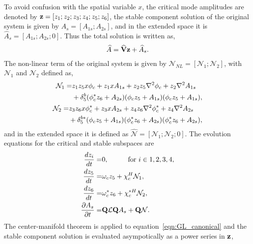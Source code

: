 To avoid confusion with the spatial variable $x$, the critical mode amplitudes are denoted by $\mathbf{z} = [z_{1};z_{2};z_{3};z_{4};z_{5};z_{6}]$, the stable component solution of the original system is given by $A_{s} = [A_{1s}; A_{2s}]$, and in the extended space it is $\widehat{A}_{s} = [A_{1s}; A_{2s}; 0]$. Thus the total solution is written as,
\begin{eqnarray}
	\widehat{A} = \widehat{\mathbf{V}}\mathbf{z} + \widehat{A}_{s}. \nonumber
\end{eqnarray}
The non-linear term of the original system is given by $\mathcal{N}_{NL} =  [\mathcal{N}_{1}; \mathcal{N}_{2}]$, with $\mathcal{N}_{1}$ and $\mathcal{N}_{2}$ defined as, 
\begin{align}
 	\begin{split}
 		\mathcal{N}_{1} =&
			z_{1}z_{5}x\phi_{c} + z_{1}xA_{1s} + z_{2}z_{5}\nabla^{2}\phi_{c} + z_{2}\nabla^{2} A_{1s} \\
			 &+ \delta^{b}_{5}(\phi^{*}_{c}z_{6} +  A_{2s}) (\phi_{c}z_{5} +  A_{1s})(\phi_{c}z_{5} +  A_{1s}),
	\end{split} \nonumber \\
	\begin{split}
		\mathcal{N}_{2} =&
		z_{3}z_{6}x\phi^{*}_{c} + z_{3}xA_{2s} + z_{4}z_{6}\nabla^{2}\phi^{*}_{c} + z_{4}\nabla^{2} A_{2s} \\
		&+ \delta^{b*}_{5}(\phi_{c}z_{5} +  A_{1s}) (\phi^{*}_{c}z_{6} +  A_{2s})(\phi^{*}_{c}z_{6} +  A_{2s}),
	\end{split} \nonumber
\end{align}
and in the extended space it is defined as $\mathcal{\widehat{N}} =  [\mathcal{N}_{1}; \mathcal{N}_{2}; 0]$. The evolution equations for the critical and stable subspaces are
\begin{subequations}
	\label{eqn:GL_canonical}
\begin{align}
	\dfrac{d z_{i}}{dt}	=& 0, \hspace{10mm} \text{for } i \in {1,2,3,4},\\
	\dfrac{d z_{5}}{dt}	=& \omega_{c}z_{5} + \chi_{c}^{H}\mathcal{N}_{1},  \\
	\dfrac{d z_{6}}{dt}	=& \omega^{*}_{c}z_{6} + \chi^{*H}_{c}\mathcal{N}_{2},  \\
	\dfrac{\partial A_{s}}{\partial t} =& \mathbf{Q}\mathcal{L}\mathbf{Q}A_{s} + \mathbf{Q}\mathcal{N}.
\end{align}
\end{subequations}
The center-manifold theorem is applied to equation~\eqref{eqn:GL_canonical} and the stable component solution is evaluated asympotically as a power series in $\mathbf{z}$, 

